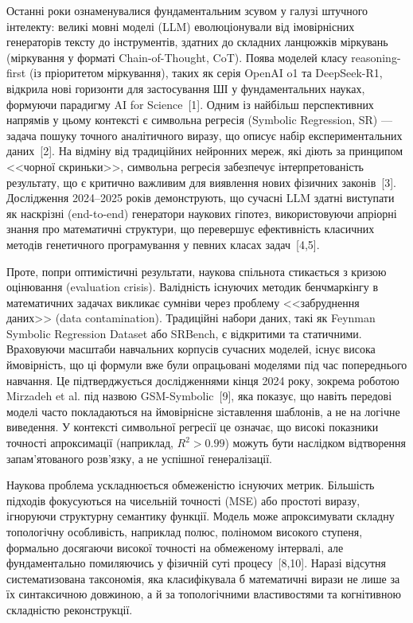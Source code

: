 \documentclass[11pt]{article}
\begin{document}
Останні роки ознаменувалися фундаментальним зсувом у галузі штучного інтелекту: великі мовні моделі (LLM) еволюціонували від імовірнісних генераторів тексту до інструментів, здатних до складних ланцюжків міркувань (міркування у форматі Chain-of-Thought, CoT). Поява моделей класу reasoning-first (із пріоритетом міркування), таких як серія OpenAI o1 та DeepSeek-R1, відкрила нові горизонти для застосування ШІ у фундаментальних науках, формуючи парадигму AI for Science~[1]. Одним із найбільш перспективних напрямів у цьому контексті є символьна регресія (Symbolic Regression, SR) --- задача пошуку точного аналітичного виразу, що описує набір експериментальних даних~[2]. На відміну від традиційних нейронних мереж, які діють за принципом <<чорної скриньки>>, символьна регресія забезпечує інтерпретованість результату, що є критично важливим для виявлення нових фізичних законів~[3]. Дослідження 2024--2025 років демонструють, що сучасні LLM здатні виступати як наскрізні (end-to-end) генератори наукових гіпотез, використовуючи апріорні знання про математичні структури, що перевершує ефективність класичних методів генетичного програмування у певних класах задач~[4,5].

Проте, попри оптимістичні результати, наукова спільнота стикається з кризою оцінювання (evaluation crisis). Валідність існуючих методик бенчмаркінгу в математичних задачах викликає сумніви через проблему <<забруднення даних>> (data contamination). Традиційні набори даних, такі як Feynman Symbolic Regression Dataset або SRBench, є відкритими та статичними. Враховуючи масштаби навчальних корпусів сучасних моделей, існує висока ймовірність, що ці формули вже були опрацьовані моделями під час попереднього навчання. Це підтверджується дослідженнями кінця 2024 року, зокрема роботою Mirzadeh et al.
під назвою GSM-Symbolic~[9], яка показує, що навіть передові моделі часто покладаються на ймовірнісне зіставлення шаблонів, а не на логічне виведення. У контексті символьної регресії це означає, що високі показники точності апроксимації (наприклад, $R^2>0.99$) можуть бути наслідком відтворення запам'ятованого розв'язку, а не успішної генералізації.

Наукова проблема ускладнюється обмеженістю існуючих метрик. Більшість підходів фокусуються на чисельній точності (MSE) або простоті виразу, ігноруючи структурну семантику функції. Модель може апроксимувати складну топологічну особливість, наприклад полюс, поліномом високого ступеня, формально досягаючи високої точності на обмеженому інтервалі, але фундаментально помиляючись у фізичній суті процесу~[8,10]. Наразі відсутня систематизована таксономія, яка класифікувала б математичні вирази не лише за їх синтаксичною довжиною, а й за топологічними властивостями та когнітивною складністю реконструкції.
\end{document}
